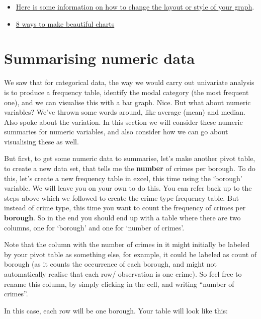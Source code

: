 \documentclass[
]{book}
\providecommand{\tightlist}{%
  \setlength{\itemsep}{0pt}\setlength{\parskip}{0pt}}
\begin{document}
\begin{itemize}
\tightlist
\item
  \href{https://support.office.com/en-gb/article/Change-the-layout-or-style-of-a-chart-a346e438-d22a-4540-aa87-bce9feb719cf}{Here is some information on how to change the layout or style of your graph}.
\item
  \href{http://www.upslide.net/blog/ways-to-make-beautiful-financial-charts-and-graphs-in-excel/}{8 ways to make beautiful charts}
\end{itemize}

\hypertarget{summarising-numeric-data}{%
\section{Summarising numeric data}\label{summarising-numeric-data}}

We saw that for categorical data, the way we would carry out univariate analysis is to produce a frequency table, identify the modal category (the most frequent one), and we can visualise this with a bar graph. Nice. But what about numeric variables? We've thrown some words around, like average (mean) and median. Also spoke about the variation. In this section we will consider these numeric summaries for numeric variables, and also consider how we can go about visualising these as well.

But first, to get some numeric data to summarise, let's make another pivot table, to create a new data set, that tells me the \textbf{number} of crimes per borough. To do this, let's create a new frequency table in excel, this time using the `borough' variable. We will leave you on your own to do this. You can refer back up to the steps above which we followed to create the crime type frequency table. But instead of crime type, this time you want to count the frequency of crimes per \textbf{borough}. So in the end you should end up with a table where there are two columns, one for `borough' and one for `number of crimes'.

Note that the column with the number of crimes in it might initially be labeled by your pivot table as something else, for example, it could be labeled as count of borough (as it counts the occurrence of each borough, and might not automatically realise that each row/ observation is one crime). So feel free to rename this column, by simply clicking in the cell, and writing ``number of crimes''.

In this case, each row will be one borough. Your table will look like this:
\end{document}
